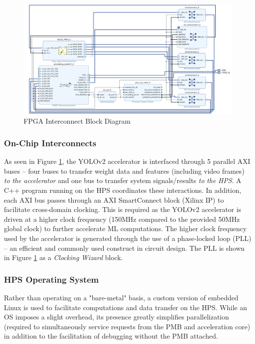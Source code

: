\begin{figure}[H]
\centering
\includegraphics[width=14cm]{img/fpga_interconnect.pdf}
\caption{FPGA Interconnect Block Diagram}
\label{interconnect}
\end{figure}

\subsubsection{On-Chip Interconnects}
As seen in Figure \ref{interconnect}, the YOLOv2 accelerator is interfaced through 5 parallel AXI buses -- four buses to transfer weight data and features (including video frames) \textit{to the accelerator} and one bus to transfer system signals/results \textit{to the HPS}. A C++ program running on the HPS coordinates these interactions. In addition, each AXI bus passes through an AXI SmartConnect block (Xilinx IP) to facilitate cross-domain clocking. This is required as the YOLOv2 accelerator is driven at a higher clock frequency (150MHz compared to the provided 50MHz global clock) to further accelerate ML computations. The higher clock frequency used by the accelerator is generated through the use of a phase-locked loop (PLL) -- an efficient and commonly used construct in circuit design. The PLL is shown in Figure \ref{interconnect} as a \textit{Clocking Wizard} block.

\subsubsection{HPS Operating System}
Rather than operating on a "bare-metal" basis, a custom version of embedded Linux is used to facilitate computations and data transfer on the HPS. While an OS imposes a slight overhead, its presence greatly simplifies parallelization (required to simultaneously service requests from the PMB and acceleration core) in addition to the facilitation of debugging without the PMB attached. 

